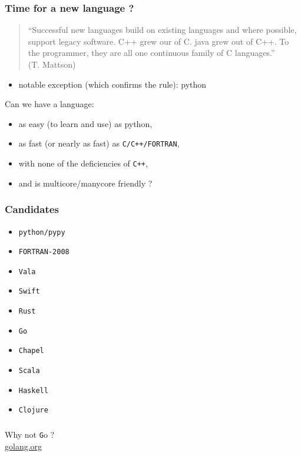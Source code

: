 \documentclass[9pt]{beamer}
\begin{document}
\begin{frame}
\frametitle{Time for a new language ?}
\begin{quotation} %

 ``Successful new languages build on existing languages and where possible, support legacy software. C++ grew our of C. java grew out of C++. To the programmer, they are all one continuous family of C languages.''\\
 (T. Mattson)
\end{quotation}
\quad


\begin{itemize}
\item notable exception (which confirms the rule): \alert{python}
\end{itemize}
\begin{alertblock}{\quad}
    Can we have a language:
\begin{itemize}
\item as easy (to learn and use) as \alert{python},
\item as fast (or nearly as fast) as \verb~C/C++/FORTRAN~,
\item with none of the deficiencies of \verb~C++~,
\item and is multicore/manycore friendly ?
\end{itemize}
\end{alertblock}
\end{frame}

\begin{frame}[fragile]
\frametitle{Candidates}
\begin{itemize}
\item \verb~python/pypy~
\item \verb~FORTRAN-2008~
\item \verb~Vala~
\item \verb~Swift~
\item \verb~Rust~
\item \verb~Go~
\item \verb~Chapel~
\item \verb~Scala~
\item \verb~Haskell~
\item \verb~Clojure~
\end{itemize}
\end{frame}

\begin{frame}
\frametitle{\quad}

\begin{center}
  Why not {\texttt Go} ?\\
  \href{http://golang.org}{{\color{blue}golang.org}}
\end{center}
\end{frame}
\end{document}
